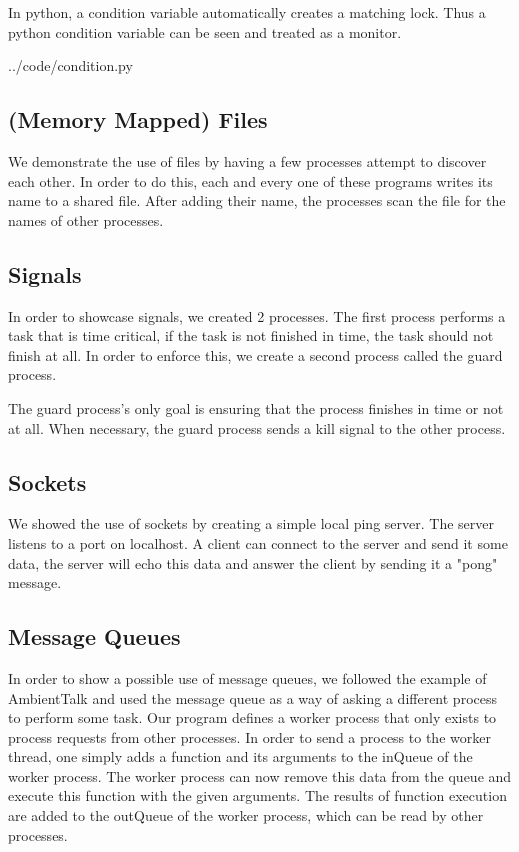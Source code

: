 In python, a condition variable automatically creates a matching lock. Thus a python condition variable can be seen and treated as a monitor.

	{../code/condition.py}
\newpage

\subsection{(Memory Mapped) Files}
We demonstrate the use of files by having a few processes attempt to discover each other. In order to do this, each and every one of these programs writes its name to a shared file. After adding their name, the processes scan the file for the names of other processes.


\newpage

\subsection{Signals}
In order to showcase signals, we created 2 processes. The first process performs a task that is time critical, if the task is not finished in time, the task should not finish at all. In order to enforce this, we create a second process called the guard process.

The guard process's only goal is ensuring that the process finishes in time or not at all. When necessary, the guard process sends a kill signal to the other process.


\newpage

\subsection{Sockets}
We showed the use of sockets by creating a simple local ping server. The server listens to a port on localhost. A client can connect to the server and send it some data, the server will echo this data and answer the client by sending it a "pong" message. 


\newpage

\subsection{Message Queues}
In order to show a possible use of message queues, we followed the example of AmbientTalk and used the message queue as a way of asking a different process to perform some task. Our program  defines a worker process that only exists to process requests from other processes. In order to send a process to the worker thread, one simply adds a function and its arguments to the inQueue of the worker process. The worker process can now remove this data from the queue and execute this function with the given arguments. The results of function execution are added to the outQueue of the worker process, which can be read by other processes.

